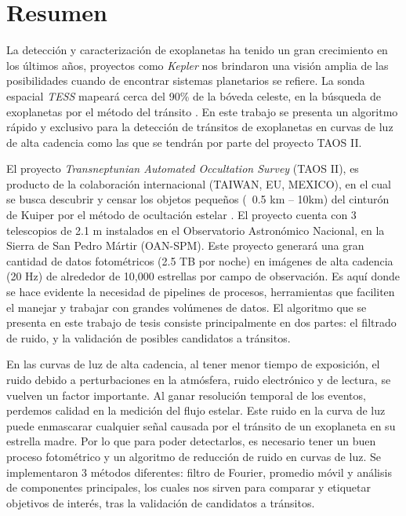\thispagestyle{plain}
\newpage

\chapter*{\textbf{Resumen}}

La detección y caracterización de exoplanetas ha tenido un gran crecimiento en los últimos años, proyectos como \textit{Kepler} nos brindaron una visión amplia de las posibilidades cuando de encontrar sistemas planetarios se refiere. La sonda espacial \textit{TESS} mapeará cerca del 90\% de la bóveda celeste, en la búsqueda de exoplanetas por el método del tránsito \cite{ricker2014transiting}. En este trabajo se presenta un algoritmo rápido y exclusivo para la detección de tránsitos de exoplanetas en curvas de luz de alta cadencia como las que se tendrán por parte del proyecto TAOS II.  

El proyecto \textit{Transneptunian Automated Occultation Survey} (TAOS II), es producto de la colaboración internacional (TAIWAN, EU, MEXICO), en el cual se busca descubrir y censar los objetos pequeños (~0.5 km – 10km) del cinturón de Kuiper por el método de ocultación estelar \cite{lehner2012transneptunian}. El proyecto cuenta con 3 telescopios de 2.1 m instalados en el Observatorio Astronómico Nacional, en la Sierra de San Pedro Mártir (OAN-SPM). Este proyecto generará una gran cantidad de datos fotométricos (2.5 TB por noche) en imágenes de alta cadencia (20 Hz) de alrededor de 10,000 estrellas por campo de observación. Es aquí donde se hace evidente la necesidad de pipelines de procesos, herramientas que faciliten el manejar y trabajar con grandes volúmenes de datos. El algoritmo que se presenta en este trabajo de tesis consiste principalmente en dos partes: el filtrado de ruido, y la validación de posibles candidatos a tránsitos.

En las curvas de luz de alta cadencia, al tener menor tiempo de exposición, el ruido debido a perturbaciones en la atmósfera, ruido electrónico y de lectura, se vuelven un factor importante. Al ganar resolución temporal de los eventos, perdemos calidad en la medición del flujo estelar. Este ruido en la curva de luz puede enmascarar cualquier señal causada por el tránsito de un exoplaneta en su estrella madre. Por lo que para poder detectarlos, es necesario tener un buen proceso fotométrico y un algoritmo de reducción de ruido en curvas de luz. Se implementaron 3 métodos diferentes: filtro de Fourier, promedio móvil y análisis de componentes principales, los cuales nos sirven para comparar y etiquetar objetivos de interés, tras la validación de candidatos a tránsitos.

